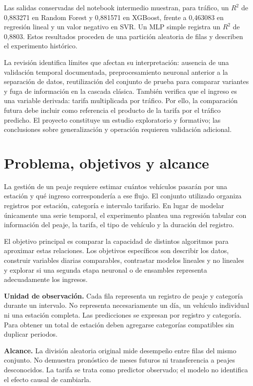 \documentclass[11pt,a4paper]{article}
\begin{document}
Las salidas conservadas del notebook intermedio muestran, para tráfico, un $R^2$ de 0,883271 en Random Forest y 0,881571 en XGBoost, frente a 0,463083 en regresión lineal y un valor negativo en SVR. Un MLP simple registra un $R^2$ de 0,8803. Estos resultados proceden de una partición aleatoria de filas y describen el experimento histórico.

La revisión identifica límites que afectan su interpretación: ausencia de una validación temporal documentada, preprocesamiento neuronal anterior a la separación de datos, reutilización del conjunto de prueba para comparar variantes y fuga de información en la cascada clásica. También verifica que el ingreso es una variable derivada: tarifa multiplicada por tráfico. Por ello, la comparación futura debe incluir como referencia el producto de la tarifa por el tráfico predicho. El proyecto constituye un estudio exploratorio y formativo; las conclusiones sobre generalización y operación requieren validación adicional.

\section{Problema, objetivos y alcance}
La gestión de un peaje requiere estimar cuántos vehículos pasarán por una estación y qué ingreso correspondería a ese flujo. El conjunto utilizado organiza registros por estación, categoría e intervalo tarifario. En lugar de modelar únicamente una serie temporal, el experimento plantea una regresión tabular con información del peaje, la tarifa, el tipo de vehículo y la duración del registro.

El objetivo principal es comparar la capacidad de distintos algoritmos para aproximar estas relaciones. Los objetivos específicos son describir los datos, construir variables diarias comparables, contrastar modelos lineales y no lineales y explorar si una segunda etapa neuronal o de ensambles representa adecuadamente los ingresos.

\textbf{Unidad de observación.} Cada fila representa un registro de peaje y categoría durante un intervalo. No representa necesariamente un día, un vehículo individual ni una estación completa. Las predicciones se expresan por registro y categoría. Para obtener un total de estación deben agregarse categorías compatibles sin duplicar periodos.

\textbf{Alcance.} La división aleatoria original mide desempeño entre filas del mismo conjunto. No demuestra pronóstico de meses futuros ni transferencia a peajes desconocidos. La tarifa se trata como predictor observado; el modelo no identifica el efecto causal de cambiarla.
\par\medskip
\end{document}
